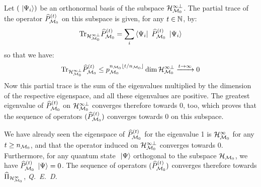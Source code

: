  Let $(\ \left|{\Psi_i}\right\rangle)$ be an orthonormal basis of the subspace $\mathcal H_{\mathcal M_0}^{\infty \perp}$. The partial trace of the operator $\widehat{P}_{\mathcal M_0}^{(t)}$ on this subspace is given, for any $t \in \mathbb{N}$, by: 
\begin{equation*}
\mathrm{Tr}_{\mathcal H_{\mathcal M_0}^{\infty \perp}} \widehat{P}_{\mathcal M_0}^{(t)} = \sum_i \left\langle{\Psi_i}\right|\  \widehat{P}_{\mathcal M_0}^{(t)} \ \left|{\Psi_i}\right\rangle
\end{equation*}
so that we have:
\begin{equation*}
\mathrm{Tr}_{\mathcal H_{\mathcal M_0}^{\infty \perp}} \widehat{P}_{\mathcal M_0}^{(t)} \leq p_{\mathcal M_0}^{n_{\mathcal M_0} \lfloor t / n_{\mathcal M_0}  \rfloor} \dim \mathcal H_{\mathcal M_0}^{\infty \perp} \xrightarrow{t \to \infty} 0
\end{equation*}
Now this partial trace is the sum of the eigenvalues multiplied by the dimension of the respective eigenspace, and all these eigenvalues are positive. The greatest eigenvalue of $\widehat{P}_{\mathcal M_0}^{(t)}$ on $\mathcal H_{\mathcal M_0}^{\infty \perp}$ converges therefore towards 0, too, which proves that the sequence of operators $(\widehat{P}_{\mathcal M_0}^{(t)})$ converges towards 0 on this subspace.

 We have already seen the eigenspace of $\widehat{P}_{\mathcal M_0}^{(t)}$ for the eigenvalue 1 is $\mathcal H_{\mathcal M_0}^\infty$ for any $t \geq n_{\mathcal M_0}$, and that the operator induced on $\mathcal H_{\mathcal M_0}^{\infty \perp}$ converges towards 0. Furthermore, for any quantum state $\ \left|{\Psi}\right\rangle$ orthogonal to the subspace $\mathcal H_{\mathcal M_0}$, we have $\widehat{P}_{\mathcal M_0}^{(t)} \ \left|{\Psi}\right\rangle = 0$. The sequence of operators $(\widehat{P}_{\mathcal M_0}^{(t)})$ converges therefore towards $\widehat{\Pi}_{\mathcal H_{\mathcal M_0}^\infty}$, \textit{Q.~E.~D.}

